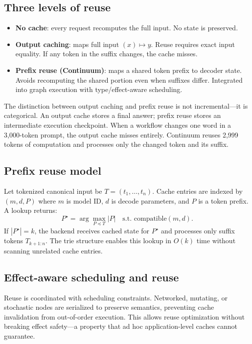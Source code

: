 \documentclass[10pt,twocolumn]{article}
\begin{document}
\subsection{Three levels of reuse}
\begin{itemize}[leftmargin=*]
  \item \textbf{No cache}: every request recomputes the full input. No state is preserved.
  \item \textbf{Output caching}: maps full input $(x) \mapsto y$. Reuse requires exact input equality. If any token in the suffix changes, the cache misses.
  \item \textbf{Prefix reuse (Continuum)}: maps a shared token prefix to decoder state. Avoids recomputing the shared portion even when suffixes differ. Integrated into graph execution with type/effect-aware scheduling.
\end{itemize}

The distinction between output caching and prefix reuse is not incremental---it is categorical. An output cache stores a final answer; prefix reuse stores an intermediate execution checkpoint. When a workflow changes one word in a 3,000-token prompt, the output cache misses entirely. Continuum reuses 2,999 tokens of computation and processes only the changed token and its suffix.

\subsection{Prefix reuse model}
Let tokenized canonical input be $T = (t_1, \dots, t_n)$. Cache entries are indexed by $(m, d, P)$ where $m$ is model ID, $d$ is decode parameters, and $P$ is a token prefix. A lookup returns:
\[
P^\star = \arg\max_{P \preceq T} |P| \quad \text{s.t.\ } \text{compatible}(m, d).
\]
If $|P^\star| = k$, the backend receives cached state for $P^\star$ and processes only suffix tokens $T_{k+1:n}$. The trie structure enables this lookup in $O(k)$ time without scanning unrelated cache entries.

\subsection{Effect-aware scheduling and reuse}
Reuse is coordinated with scheduling constraints. Networked, mutating, or stochastic nodes are serialized to preserve semantics, preventing cache invalidation from out-of-order execution. This allows reuse optimization without breaking effect safety---a property that ad hoc application-level caches cannot guarantee.
\end{document}
